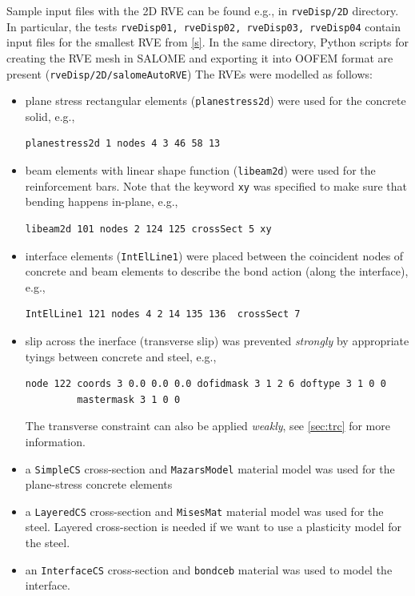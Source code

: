 \documentclass[11pt]{article}
\begin{document}
Sample input files with the 2D RVE can be found e.g., in \texttt{rveDisp/2D} directory. In particular, the tests \texttt{rveDisp01, rveDisp02, rveDisp03, rveDisp04} contain input files for the smallest RVE from \cref{s}. In the same directory, Python scripts for creating the RVE mesh in SALOME and exporting it into OOFEM format are present (\texttt{rveDisp/2D/salomeAutoRVE})
The RVEs were modelled as follows:
\begin{itemize}
    \item plane stress rectangular elements (\texttt{planestress2d}) were used for the concrete solid, e.g., 
    \begin{lstlisting}[style=oofem, language=oofeminput]
planestress2d 1 nodes 4 3 46 58 13
    \end{lstlisting}
    \item beam elements with linear shape function (\texttt{libeam2d}) were used for the reinforcement bars. Note that the keyword \texttt{xy} was specified to make sure that bending happens in-plane, e.g.,
    \begin{lstlisting}[style=oofem, language=oofeminput]
libeam2d 101 nodes 2 124 125 crossSect 5 xy
    \end{lstlisting}
    \item interface elements (\texttt{IntElLine1}) were placed between the coincident nodes of concrete and beam elements to describe the bond action (along the interface), e.g.,
    \begin{lstlisting}[style=oofem, language=oofeminput]
IntElLine1 121 nodes 4 2 14 135 136  crossSect 7
    \end{lstlisting}
    \item slip across the inerface (transverse slip) was prevented \textit{strongly} by appropriate tyings between concrete and steel, e.g.,
    \begin{lstlisting}[style=oofem, language=oofeminput]
node 122 coords 3 0.0 0.0 0.0 dofidmask 3 1 2 6 doftype 3 1 0 0 
         mastermask 3 1 0 0
    \end{lstlisting}
    The transverse constraint can also be applied \textit{weakly}, see \cref{sec:trc} for more information.
    \item a \texttt{SimpleCS} cross-section and \texttt{MazarsModel} material model was used for the plane-stress concrete elements

    \item a \texttt{LayeredCS} cross-section and \texttt{MisesMat} material model was used for the steel. Layered cross-section is needed if we want to use a plasticity model for the steel.

    \item an \texttt{InterfaceCS} cross-section and \texttt{bondceb} material was used to model the interface.
\end{itemize}
\end{document}
